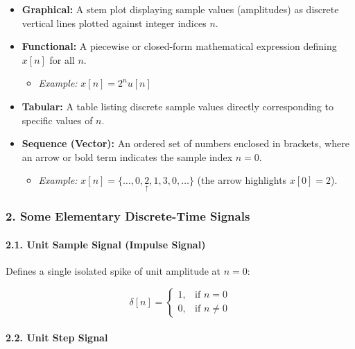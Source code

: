 \begin{itemize}
\tightlist
\item
  \textbf{Graphical:} A stem plot displaying sample values (amplitudes)
  as discrete vertical lines plotted against integer indices \(n\).
\item
  \textbf{Functional:} A piecewise or closed-form mathematical
  expression defining \(x[n]\) for all \(n\).

  \begin{itemize}
  \tightlist
  \item
    \emph{Example:} \(x[n] = 2^n u[n]\)
  \end{itemize}
\item
  \textbf{Tabular:} A table listing discrete sample values directly
  corresponding to specific values of \(n\).
\item
  \textbf{Sequence (Vector):} An ordered set of numbers enclosed in
  brackets, where an arrow or bold term indicates the sample index
  \(n = 0\).

  \begin{itemize}
  \tightlist
  \item
    \emph{Example:}
    \(x[n] = \{\dots, 0, \underset{\uparrow}{2}, 1, 3, 0, \dots\}\) (the
    arrow highlights \(x[0] = 2\)).
  \end{itemize}
\end{itemize}

\subsubsection{2. Some Elementary Discrete-Time
Signals}\label{some-elementary-discrete-time-signals}

\paragraph{2.1. Unit Sample Signal (Impulse
Signal)}\label{unit-sample-signal-impulse-signal}

Defines a single isolated spike of unit amplitude at \(n = 0\):

\[  
\delta[n] = \begin{cases} 1, & \text{if } n = 0 \\ 0, & \text{if } n \neq 0 \end{cases}  
\]

\paragraph{2.2. Unit Step Signal}\label{unit-step-signal}

